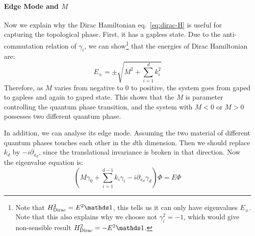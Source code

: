 \paragraph{Edge Mode and \texorpdfstring{$M$}{}}
Now we explain why the Dirac Hamiltonian eq.~\ref{eq:dirac-H}  is useful for capturing the topological
phase. First, it has a gapless state. Due to the anti-commutation relation of
$\gamma_i$, we can show\footnote{Note that $H_\text{Dirac}^2= E^2\id$, this
tells us it can only have eigenvalues $E_\pm$. Note that this also explains why
we choose not $\gamma_i^2=-1$, which would give non-sensible result
$H_\text{Dirac}^2= -E^2\id$.}
that the energies of Dirac Hamiltonian are:
\begin{equation}
    E_\pm = \pm\sqrt{M^2+\sum_{i=1}^d k^2_i}
\end{equation}
Therefore, as $M$ varies from negative to $0$ to positive, the system goes from
gaped to gapless and again to gaped state. This shows that the $M$ is parameter
controlling the quantum phase transition, and the system with $M<0$ or $M>0$
possesses two different quantum phase.

In addition, we can analyse its edge mode. Assuming the two material of
different quantum phases touches each other in the $d$th dimension. Then we
should replace $k_d$ by $-i\partial_{x_d}$, since the translational invariance is
broken in that direction. Now the eigenvalue equation is:
\begin{equation}
    ( M\gamma_0 + \sum_{i=1}^{d-1} k_i\gamma_i - i\partial_{x_d}\gamma_d ) \Phi
    = E \Phi
\end{equation}

